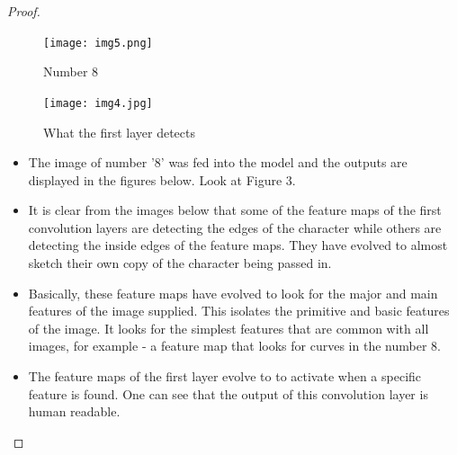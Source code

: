 \documentclass{article}
\theoremstyle{case}
\begin{document}
\begin{proof} 
\begin{figure}[t]
\centering
            \caption{Number 8}
            \texttt{[image: img5.png]}
            
            \end{figure}
\begin{figure}[t]
\centering
            \caption{What the first layer detects}
            \texttt{[image: img4.jpg]}
            
            \end{figure}
    
            \begin{itemize}
\item The image of number '8' was fed into the model and the outputs are displayed in the figures below. Look at Figure 3.
\item It is clear from the images below that some of the feature maps of the first convolution layers are detecting the edges of the character while others are detecting the inside edges of the feature maps. They have evolved to almost sketch their own copy of the character being passed in.

\item Basically, these feature maps have evolved to look for the major and main features of the image supplied. This isolates the primitive and basic features of the image. It looks for the simplest features that are common with all images, for example - a feature map that looks for curves in the number 8.
\item The feature maps of the first layer evolve to to activate when a specific feature is found. One can see that the output of this convolution layer is human readable.
\end{itemize}
\end{proof}
\end{document}
